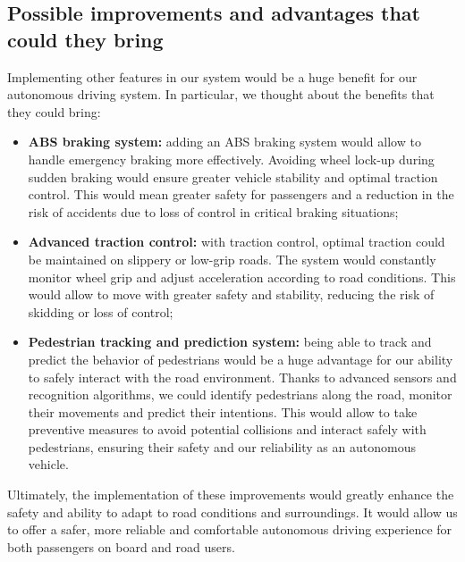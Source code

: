 \documentclass{article}
\begin{document}
\subsection{Possible improvements and advantages that could they bring}
Implementing other features in our system would be a huge benefit for our autonomous driving system.
In particular, we thought about the benefits that they could bring:
\begin{itemize}
    \item \textbf{ABS braking system:} adding an ABS braking system would allow to handle emergency braking more effectively. Avoiding wheel lock-up during sudden braking would ensure greater vehicle stability and optimal traction control. This would mean greater safety for passengers and a reduction in the risk of accidents due to loss of control in critical braking situations;
    \item \textbf{Advanced traction control:} with traction control, optimal traction could be maintained on slippery or low-grip roads. The system would constantly monitor wheel grip and adjust acceleration according to road conditions. This would allow to move with greater safety and stability, reducing the risk of skidding or loss of control;
    \item \textbf{Pedestrian tracking and prediction system:} being able to track and predict the behavior of pedestrians would be a huge advantage for our ability to safely interact with the road environment. Thanks to advanced sensors and recognition algorithms, we could identify pedestrians along the road, monitor their movements and predict their intentions. This would allow to take preventive measures to avoid potential collisions and interact safely with pedestrians, ensuring their safety and our reliability as an autonomous vehicle.
\end{itemize}
Ultimately, the implementation of these improvements would greatly enhance the safety and ability to adapt to
road conditions and surroundings. It would allow us to offer a safer, more reliable and comfortable autonomous
driving experience for both passengers on board and road users.

\printbibliography
\end{document}
